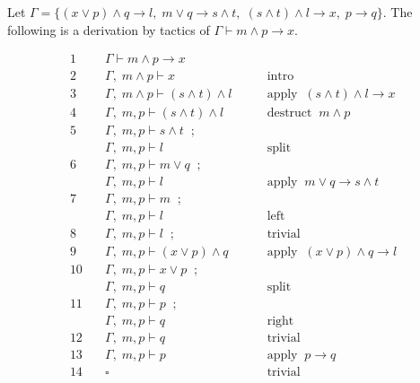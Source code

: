 \documentclass[a4paper,UKenglish]{lipics}
\newcommand{\G}{\Gamma}
\begin{document}
\begin{example}
Let 
$\G=\{(x\lor p) \land q \to  l ,\;m\lor q\to s\land t,\;(s\land t)\land l\to x,\; p\to q\}$. The following 
is a derivation by tactics of $\G\vdash m\land p\to x$.

\[
\begin{array}{rll}
1\quad & \G\vdash m\land p\to x &  \\
2 \quad & \G,\;m\land p \vdash x & \qquad \mbox{intro} \\
3 \quad & \G,\;m\land p \vdash (s\land t)\land l & \qquad \mbox {apply} \;\; (s\land t)\land l\to x \\
4 \quad & \G,\;m, p \vdash (s\land t)\land l & \qquad \mbox {destruct} \;\; 
m\land p \\

5\quad & \G,\;m, p \vdash s\land t \;\; ; \;\; \\
&        \G,\;m, p \vdash l
 &  \qquad \mbox{split} \\ 

6\quad & \G,\;m, p \vdash m\lor q \;\; ; \;\; \\
&        \G,\;m,  p \vdash l
 &  \qquad \mbox{apply} \;\; m\lor q\to s\land t \\ 

7\quad & \G,\;m, p \vdash m \;\; ; \;\; \\
&        \G,\;m, p \vdash l
 &  \qquad \mbox{left}  \\ 


8\quad & \G,\;m,p \vdash l \;\; ; \;\; 
 &  \qquad \mbox{trivial} \\ 

9\quad & \G,\;m,p \vdash (x\lor p)\land q
 &  \qquad \mbox{apply}\;\;(x\lor p)\land q \to l \\ 

10\quad & \G,\;m,p \vdash x\lor p \;\; ; \;\; \\
& \G,\;m,p \vdash q  
 &  \qquad \mbox{split} \\ 

11\quad & \G,\;m,p \vdash p \;\; ; \;\; \\
& \G,\;m,p \vdash q  
 &  \qquad \mbox{right} \\ 

12\quad 
&        \G,\;m,p \vdash q
 &  \qquad \mbox{trivial} \\ 

13\quad 
&        \G,\;m,p \vdash p
 &  \qquad \mbox{apply}\;\;p\to q \\ 

14 \quad & \square & \qquad  \mbox{trivial}
\end{array}\]
\end{example}
\end{document}
